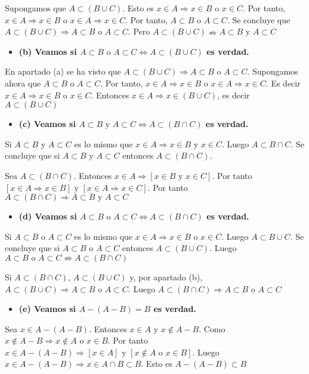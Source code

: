 \documentclass{article}
\begin{document}
Supongamos que $A\subset (B\cup C)$. Esto es $x\in A\Rightarrow x\in B \text{ o } x\in C$. Por tanto, $x\in A\Rightarrow x\in B$ o $x\in A\Rightarrow x\in C$. Por tanto, $A\subset B$ o $A\subset C$. Se concluye que $A\subset (B\cup C)\Rightarrow A\subset B\text{ o }A\subset C$. Pero $A\subset (B\cup C)\nRightarrow A\subset B\text{ y }A\subset C$ 
\begin{itemize}
\item \bf (b) \rm Veamos si  $A\subset B\text{ o }A\subset C \iff A\subset(B\cup C)$ es verdad.
\end{itemize}
En apartado (a) se ha visto que $A\subset (B\cup C)\Rightarrow A\subset B\text{ o }A\subset C$. Supongamos ahora que $A\subset B\text{ o }A\subset C$. Por tanto, $x\in A\Rightarrow x\in B\text{ o }x\in A\Rightarrow x\in C$. Es decir $x\in A\Rightarrow x\in B\text{ o } x\in C$. Entonces $x\in A\Rightarrow x\in (B\cup C)$, es decir $A\subset (B\cup C)$
\begin{itemize}
\item \bf (c) \rm Veamos si  $A\subset B\text{ y }A\subset C \iff A\subset(B\cap C)$ es verdad.
\end{itemize}
Si $A\subset B$ y $A\subset C$ es lo mismo que $ x\in A\Rightarrow x\in B \text{ y } x\in C$. Luego $A\subset B\cap C$. Se concluye que si $A\subset B$ y $A\subset C$ entonces $A\subset (B\cap C)$.

Sea $A\subset (B\cap C)$. Entonces $x\in A\Rightarrow [x\in B\text{ y } x\in C]$. Por tanto $[x\in A\Rightarrow x\in B]\text{ y } [x\in A\Rightarrow x\in C]$. Por tanto $A\subset (B\cap C)\Rightarrow A\subset B \text{ y } A\subset C$
\begin{itemize}
\item \bf (d) \rm Veamos si  $A\subset B\text{ o }A\subset C \iff A\subset(B\cap C)$ es verdad.
\end{itemize}
Si $A\subset B$ o $A\subset C$ es lo mismo que $ x\in A\Rightarrow x\in B \text{ o } x\in C$. Luego $A\subset B\cup C$.  Se concluye que si $A\subset B$ o $A\subset C$ entonces $A\subset (B\cup C)$. Luego $A\subset B\text{ o }A\subset C \nRightarrow  A\subset(B\cap C)$

Si $A\subset (B\cap C)$, $A\subset (B\cup C)$ y, por apartado (b), $A\subset (B\cup C)\Rightarrow A\subset B \text{ o } A\subset C$. Luego $A\subset (B\cap C)\Rightarrow A\subset B \text{ o } A\subset C$

\begin{itemize}
\item \bf (e) \rm Veamos si  $A-(A-B)=B$ es verdad.
\end{itemize}
Sea $x\in A-(A-B)$. Entonces $x\in A$ y $x\notin A-B$. Como $x\notin A-B\Rightarrow x\notin A\text{ o }x\in B$. Por tanto $x\in A-(A-B)\Rightarrow [x\in A]\text{ y } [x\notin A \text{ o } x\in B]$. Luego $x\in A-(A-B)\Rightarrow x\in A\cap B\subset B$. Esto es $A-(A-B)\subset B$
\end{document}
